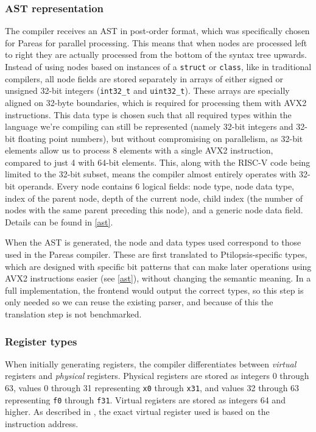 \documentclass[12pt,dvipsnames]{article}
\newcommand{\icpp}[1]{\texttt{#1}}
\newcommand{\mono}[1]{\texttt{#1}}
\begin{document}
\subsubsection*{AST representation}
The compiler receives an AST in post-order format, which was specifically chosen for Pareas for parallel processing. This means that when nodes are processed left to right they are actually processed from the bottom of the syntax tree upwards. Instead of using nodes based on instances of a \icpp{struct} or \icpp{class}, like in traditional compilers, all node fields are stored separately in arrays of either signed or unsigned 32-bit integers (\icpp{int32_t} and \icpp{uint32_t}). These arrays are specially aligned on 32-byte boundaries, which is required for processing them with AVX2 instructions. This data type is chosen such that all required types within the language we're compiling can still be represented (namely 32-bit integers and 32-bit floating point numbers), but without compromising on parallelism, as 32-bit elements allow us to process 8 elements with a single AVX2 instruction, compared to just 4 with 64-bit elements. This, along with the RISC-V code being limited to the 32-bit subset, means the compiler almost entirely operates with 32-bit operands. Every node contains 6 logical fields: node type, node data type, index of the parent node, depth of the current node, child index (the number of nodes with the same parent preceding this node), and a generic node data field. Details can be found in \autoref{ast}.

When the AST is generated, the node and data types used correspond to those used in the Pareas compiler. These are first translated to Ptilopsis-specific types, which are designed with specific bit patterns that can make later operations using AVX2 instructions easier (see \autoref{ast}), without changing the semantic meaning. In a full implementation, the frontend would output the correct types, so this step is only needed so we can reuse the existing parser, and because of this the translation step is not benchmarked.

\subsubsection*{Register types}
When initially generating registers, the compiler differentiates between \textit{virtual} registers and \textit{physical} registers. Physical registers are stored as integers 0 through 63, values 0 through 31 representing \mono{x0} through \mono{x31}, and values 32 through 63 representing \mono{f0} through \mono{f31}. Virtual registers are stored as integers 64 and higher. As described in \cite{huijben2021}, the exact virtual register used is based on the instruction address.
\end{document}
